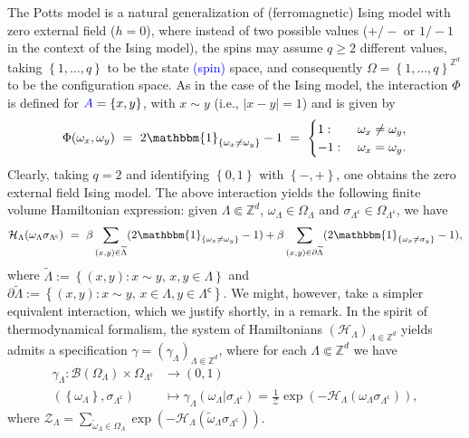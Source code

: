 \documentclass[12pt]{article}
\newcommand{\BB}{\mathscr{B}}
\renewcommand{\H}{\mathcal{H}}
\newcommand{\Z}{\mathbb{Z}}
\newcommand{\ZZ}{\mathcal{Z}}
\newcommand{\set}[1]{\left\{#1\right\}}
\newcommand{\oklepaj}[1]{\left(#1\right)}
\newcommand{\ra}{\rightarrow}
\newcommand{\1}{\mathbbm{1}}
\renewcommand{\c}{\mathsf{c}}
\newcommand{\5}{\vspace{0.5cm}}
\renewcommand{\tilde}{\widetilde}
\theoremstyle{definition}
\begin{document}
The Potts model is a natural generalization of (ferromagnetic) Ising model with zero external field ($h=0$), where instead of two possible values ($+/-$ or $1/-1$ in the context of the Ising model), the spins may assume $q\geq 2$ different values, taking $\set{1,\ldots,q}$ to be the state \textcolor{blue}{(spin)} space, and consequently $\Omega=\set{1,\ldots,q}^{\Z^d}$ to be the configuration space. As in the case of the Ising model, the interaction $\Phi$ is defined for $\textcolor{blue}{A}=\set{x,y}$, with $x\sim y$ (i.e., $|x-y|=1$) and is given by
$$\Phi(\omega_x,\omega_y) ~=~ 2\1_{\set{\omega_x\neq \omega_y}}-1 ~=~ \begin{cases}
1: ~&\omega_x\neq\omega_y, \\
-1: ~&\omega_x=\omega_y.
\end{cases}$$
Clearly, taking $q=2$ and identifying $\set{0,1}$ with $\set{-,+}$, one obtains the zero external field Ising model. The above interaction yields the following finite volume Hamiltonian expression: given $\Lambda\Subset\Z^d$, $\omega_\Lambda\in\Omega_\Lambda$ and $\sigma_{\Lambda^\c}\in\Omega_{\Lambda^\c}$, we have
$$\H_\Lambda(\omega_\Lambda\sigma_{\Lambda^\c}) ~=~ \beta\sum_{(x,y)\in\tilde{\Lambda}}(2\1_{\set{\omega_x\neq\omega_y}}-1)+\beta\sum_{(x,y)\in\partial\tilde{\Lambda}}(2\1_{\set{\omega_x\neq\sigma_y}}-1),$$
where $\tilde{\Lambda}:=\set{(x,y):x\sim y,\,x,y\in\Lambda}$ and $\partial\tilde{\Lambda}:=\set{(x,y):x\sim y,\,x\in\Lambda,y\in\Lambda^\c}$. We might, however, take a simpler equivalent interaction, which we justify shortly, in a remark. In the spirit of thermodynamical formalism, the system of Hamiltonians $(\H_\Lambda)_{\Lambda\Subset\Z^d}$ yields admits a specification $\gamma=(\gamma_\Lambda)_{\Lambda\Subset\Z^d}$, where for each $\Lambda\Subset\Z^d$ we have
\begin{align*}
\gamma_\Lambda:\BB(\Omega_\Lambda)\times\Omega_{\Lambda^\c}&\ra (0,1) \\
(\set{\omega_{\Lambda}},\sigma_{\Lambda^\c})&\mapsto\gamma_{\Lambda}(\omega_{\Lambda}|\sigma_{\Lambda^\c})=\frac{1}{\ZZ}\exp\!\oklepaj{-\H_\Lambda(\omega_\Lambda\sigma_{\Lambda^\c})},
\end{align*}
where $\ZZ_\Lambda=\sum_{\tilde{\omega}_\Lambda\in\Omega_\Lambda}\exp\!\oklepaj{-\H_\Lambda(\tilde{\omega}_{\Lambda}\sigma_{\Lambda^\c})}$.
\end{document}
